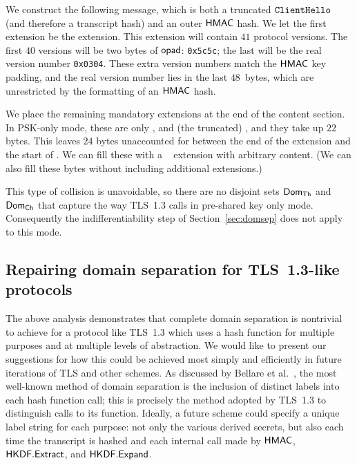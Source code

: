 We construct the following message, which is both a truncated $\mathtt{ClientHello}$ (and therefore a transcript hash) and an outer $\mathsf{HMAC}$ hash. 
We let the first extension be the  extension. 
This extension will contain $41$ protocol versions. 
The first $40$ versions will be two bytes of $\mathsf{opad}$: \texttt{0x5c5c}; the last will be the real version number \texttt{0x0304}. 
These extra version numbers match the $\mathsf{HMAC}$ key padding, and the real version number lies in the last $48$~bytes, which are unrestricted by the formatting of an $\mathsf{HMAC}$ hash. 

We place the remaining mandatory extensions at the end of the content section. 
In PSK-only mode, these are only  , and (the truncated) , and they take up $22$~ bytes. 
This leaves $24$ bytes unaccounted for between the end of the  extension and the start of . 
We can fill these with a  ~\cite[Section 4.2.2]{rfc8446} extension with arbitrary content. 
(We can also fill these bytes without including additional extensions.)

This type of collision is unavoidable, so there are no disjoint sets $\mathsf{Dom}_{\mathsf{Th}}$ and $\mathsf{Dom}_{\mathsf{Ch}}$ that capture the way TLS~1.3 calls  in pre-shared key only mode. Consequently the indifferentiability step of Section~\ref{sec:domsep} does not apply to this mode. 

\iffull
\subsection{Repairing domain separation for TLS~1.3-like protocols}\label{apx-domsep-fix}
The above analysis demonstrates that complete domain separation is nontrivial to achieve for a protocol like TLS~1.3 which uses a hash function for multiple purposes and at multiple levels of abstraction.
We would like to present our suggestions for how this could be achieved most simply and efficiently in future iterations of TLS and other schemes. 
As discussed by Bellare et al.~\cite{EC:BelDavGun20}, the most well-known method of domain separation is the inclusion of distinct labels into each hash function call; this is precisely the method adopted by TLS~1.3 to distinguish calls to its  function.
Ideally, a future scheme could specify a unique label string for each purpose: not only the various derived secrets, but also each time the transcript is hashed and each internal call made by $\mathsf{HMAC}$, $\mathsf{HKDF.Extract}$, and $\mathsf{HKDF.Expand}$.

